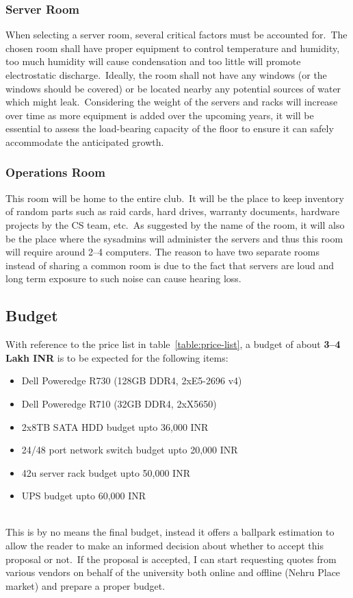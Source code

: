 \subsubsection{Server Room}
When selecting a server room, several critical factors must be accounted for.\ The chosen room shall have proper
equipment to control temperature and humidity, too much humidity will cause condensation and too little will promote
electrostatic discharge.\ Ideally, the room shall not have any windows (or the windows should be covered) or be located
nearby any potential sources of water which might leak.\ Considering the weight of the servers and racks will increase
over time as more equipment is added over the upcoming years, it will be essential to assess the load-bearing capacity
of the floor to ensure it can safely accommodate the anticipated growth.

\subsubsection{Operations Room}
This room will be home to the entire club.\ It will be the place to keep inventory of random parts such as raid cards,
hard drives, warranty documents, hardware projects by the CS team, etc.\ As suggested by the name of the room, it will
also be the place where the sysadmins will administer the servers and thus this room will require around 2--4 computers.
The reason to have two separate rooms instead of sharing a common room is due to the fact that servers are loud and long
term exposure to such noise can cause hearing loss.


\subsection{Budget}\label{subsec:budget}
With reference to the price list in table~\ref{table:price-list}, a budget of about \textbf{\large3--4 Lakh INR} is
to be expected for the following items:
\begin{itemize}
    \item Dell Poweredge R730 (128GB DDR4, 2xE5-2696 v4)
    \item Dell Poweredge R710 (32GB DDR4, 2xX5650)
    \item 2x8TB SATA HDD budget upto 36,000 INR
    \item 24/48 port network switch budget upto 20,000 INR
    \item 42u server rack budget upto 50,000 INR
    \item UPS budget upto 60,000 INR
\end{itemize}
\\
This is by no means the final budget, instead it offers a ballpark estimation to allow the reader to make an informed
decision about whether to accept this proposal or not.\ If the proposal is accepted, I can start requesting quotes
from various vendors on behalf of the university both online and offline (Nehru Place market) and prepare a proper
budget.



